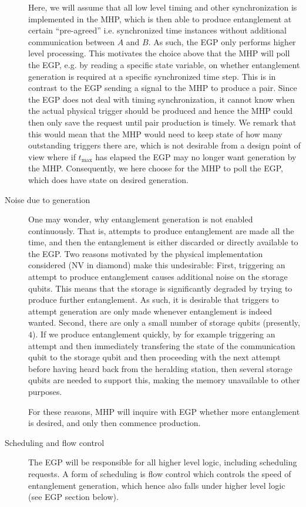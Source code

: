 \documentclass{article}
\begin{document}
\begin{description}
Here, we will assume that all low level timing and other synchronization is implemented in the MHP, which is then able to produce entanglement
at certain ``pre-agreed'' i.e. synchronized 
time instances without additional communication between $A$ and $B$. As such, the EGP only performs higher level processing.
This motivates the choice above that the MHP will poll the EGP, e.g. by reading a specific state variable, on whether entanglement generation is required at a specific synchronized time step. This is in contrast to the EGP sending a signal to the MHP to produce a pair. Since the EGP does not deal with timing synchronization, 
it cannot know when the actual physical trigger should be produced and hence the MHP could then only save the request until pair production is timely. 
We remark that this would mean that the MHP would need to keep state 
of how many outstanding triggers there are, which is not desirable from a design point of view where if $t_{\max}$ has elapsed the EGP may no longer want generation by the MHP. Consequently, we here choose for the MHP to poll the EGP, which does have state on desired generation.

\item[Noise due to generation]
One may wonder, why entanglement generation is not enabled continuously. That is, attempts to produce entanglement are made all the time, and then
the entanglement is either discarded or directly available to the EGP.
Two reasons motivated by the physical implementation considered (NV in diamond) make this undesirable:
First, triggering an attempt to produce entanglement causes additional noise on the storage qubits. This means that the storage is significantly degraded
by trying to produce further entanglement. As such, it is desirable that triggers to attempt generation are only made whenever entanglement is indeed wanted.
Second, there are only a small number of storage qubits (presently, $4$). If we produce entanglement quickly, by for example triggering an attempt and then immediately transfering the state of the communication qubit to the storage qubit and then proceeding with the next attempt before having heard back from the heralding station, 
then several storage qubits are needed to support this, making the memory unavailable to other purposes.

For these reasons, MHP will inquire with EGP whether more entanglement is desired, and only then commence production.

\item[Scheduling and flow control]
The EGP will be responsible for all higher level logic, including scheduling requests. A form of scheduling
is flow control which controls the speed of entanglement generation, which hence also falls under higher level logic
(see EGP section below). 


\end{description}
\end{document}
